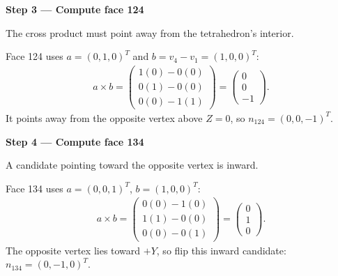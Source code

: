 \documentclass[letterpaper,11pt,english,openany,oneside]{jupyterBook}
\begin{document}
\par

\par\medskip{}
{\color{QuizStepRed}\bfseries Step 3 — Compute face 124}\par\smallskip

\sphinxAtStartPar
{} The cross product must point away from the tetrahedron’s interior.

\sphinxAtStartPar
Face 124 uses {\color{QuizMathBlue} \(a=(0,1,0)^T\)} and {\color{QuizMathBlue} \(b=v_4-v_1=(1,0,0)^T\)}:
{\color{QuizMathBlue} \begin{equation*}
\begin{split}
a\times b=\begin{pmatrix}1(0)-0(0)\\0(1)-0(0)\\0(0)-1(1)\end{pmatrix}
=\begin{pmatrix}0\\0\\-1\end{pmatrix}.
\end{split}
\end{equation*}}
\sphinxAtStartPar
It points away from the opposite vertex above {\color{QuizMathBlue} \(Z=0\)}, so {\color{QuizMathBlue} \(n_{124}=(0,0,-1)^T\)}.

\par

\par\medskip{}
{\color{QuizStepRed}\bfseries Step 4 — Compute face 134}\par\smallskip

\sphinxAtStartPar
{} A candidate pointing toward the opposite vertex is inward.

\sphinxAtStartPar
Face 134 uses {\color{QuizMathBlue} \(a=(0,0,1)^T\)}, {\color{QuizMathBlue} \(b=(1,0,0)^T\)}:
{\color{QuizMathBlue} \begin{equation*}
\begin{split}
a\times b=\begin{pmatrix}0(0)-1(0)\\1(1)-0(0)\\0(0)-0(1)\end{pmatrix}
=\begin{pmatrix}0\\1\\0\end{pmatrix}.
\end{split}
\end{equation*}}
\sphinxAtStartPar
The opposite vertex lies toward {\color{QuizMathBlue} \(+Y\)}, so flip this inward candidate: {\color{QuizMathBlue} \(n_{134}=(0,-1,0)^T\)}.
\end{document}
